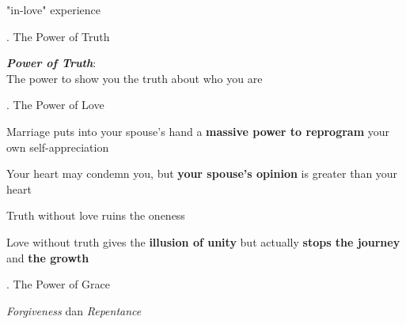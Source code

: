 \documentclass{beamer}
\begin{document}
\begin{frame}{}
	\LARGE
	\centering
	"in-love" experience
\end{frame}

\begin{frame}{}
	\LARGE
	. The Power of Truth
\end{frame}


\begin{frame}{}
	\LARGE
	\centering
	\textit{\textbf{Power of Truth}}:\\ 
	The power to show you the truth about who you are
\end{frame}


\begin{frame}{}
	\LARGE
	. The Power of Love
\end{frame}

\begin{frame}{}
	\LARGE
	\centering
	Marriage puts into your spouse's hand a \textbf{massive power to reprogram} your own self-appreciation
\end{frame}


\begin{frame}{}
	\LARGE
	\centering
	Your heart may condemn you, but \textbf{your spouse's opinion} is greater than your heart
\end{frame}

\begin{frame}{}
	\LARGE
	\centering
	Truth without love ruins the oneness
\end{frame}

\begin{frame}{}
	\LARGE
	\centering
	Love without truth gives the \textbf{illusion of unity} but actually \textbf{stops the journey} and \textbf{the growth}
\end{frame}

\begin{frame}{}
	\LARGE
	. The Power of Grace
\end{frame}

\begin{frame}{}
	\LARGE
	\centering
	\textit{Forgiveness} dan \textit{Repentance}
\end{frame}
\end{document}
